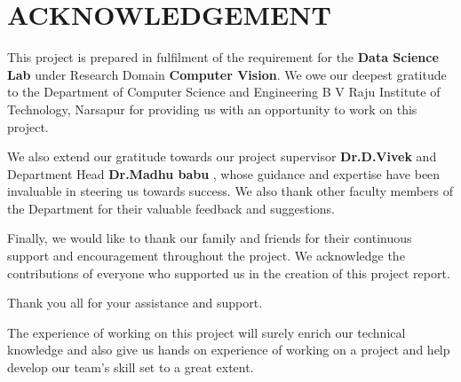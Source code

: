 \newpage
\section*{ACKNOWLEDGEMENT}
\quad This project is prepared in fulfilment of the requirement for the \textbf{Data  Science  Lab} under Research Domain \textbf{Computer  Vision}. We owe our deepest gratitude to the Department of Computer Science and Engineering \break B V Raju Institute of Technology, Narsapur for providing us with an opportunity to work on this project.
\vspace{0.2cm}

\quad We also extend our gratitude towards our project supervisor \textbf{Dr.D.Vivek} and Department Head \textbf{Dr.Madhu babu} , whose guidance and expertise have been invaluable in steering us towards success. We also thank other faculty members of the Department for their valuable feedback and suggestions.

\quad Finally, we would like to thank our family and friends for their continuous support and encouragement throughout the project. We acknowledge the contributions of everyone who supported us in the creation of this project report.

\quad Thank you all for your assistance and support.


\quad The experience of working on this project will surely enrich our
technical knowledge and also give us hands on experience of working on a project and help develop our team's skill set to a great extent.


